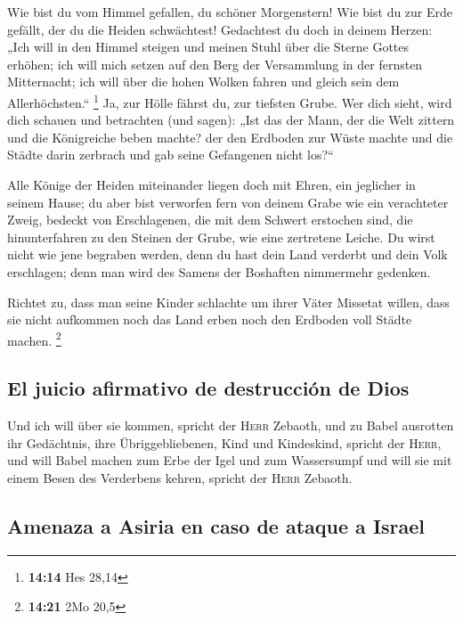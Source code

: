  Wie bist du vom Himmel gefallen, du schöner Morgenstern!
Wie bist du zur Erde gefällt, der du die Heiden schwächtest!
 Gedachtest du doch in deinem Herzen: „Ich will in den
Himmel steigen und meinen Stuhl über die Sterne Gottes erhöhen;
 ich will mich setzen auf den Berg der Versammlung in der
fernsten Mitternacht; ich will über die hohen Wolken fahren und gleich
sein dem Allerhöchsten.`` \footnote{\textbf{14:14} Hes 28,14}
 Ja, zur Hölle fährst du, zur tiefsten Grube.
 Wer dich sieht, wird dich schauen und betrachten (und
sagen): „Ist das der Mann, der die Welt zittern und die Königreiche
beben machte?  der den Erdboden zur Wüste machte und die
Städte darin zerbrach und gab seine Gefangenen nicht los?{}``

 Alle Könige der Heiden miteinander liegen doch mit
Ehren, ein jeglicher in seinem Hause;  du aber bist
verworfen fern von deinem Grabe wie ein verachteter Zweig, bedeckt von
Erschlagenen, die mit dem Schwert erstochen sind, die hinunterfahren zu
den Steinen der Grube, wie eine zertretene Leiche.  Du
wirst nicht wie jene begraben werden, denn du hast dein Land verderbt
und dein Volk erschlagen; denn man wird des Samens der Boshaften
nimmermehr gedenken.

 Richtet zu, dass man seine Kinder schlachte um ihrer
Väter Missetat willen, dass sie nicht aufkommen noch das Land erben noch
den Erdboden voll Städte machen. \footnote{\textbf{14:21} 2Mo 20,5}

\hypertarget{el-juicio-afirmativo-de-destrucciuxf3n-de-dios}{%
\subsection{El juicio afirmativo de destrucción de
Dios}\label{el-juicio-afirmativo-de-destrucciuxf3n-de-dios}}

 Und ich will über sie kommen, spricht der \textsc{Herr}
Zebaoth, und zu Babel ausrotten ihr Gedächtnis, ihre Übriggebliebenen,
Kind und Kindeskind, spricht der \textsc{Herr},  und will
Babel machen zum Erbe der Igel und zum Wassersumpf und will sie mit
einem Besen des Verderbens kehren, spricht der \textsc{Herr} Zebaoth.

\hypertarget{amenaza-a-asiria-en-caso-de-ataque-a-israel}{%
\subsection{Amenaza a Asiria en caso de ataque a
Israel}\label{amenaza-a-asiria-en-caso-de-ataque-a-israel}}

